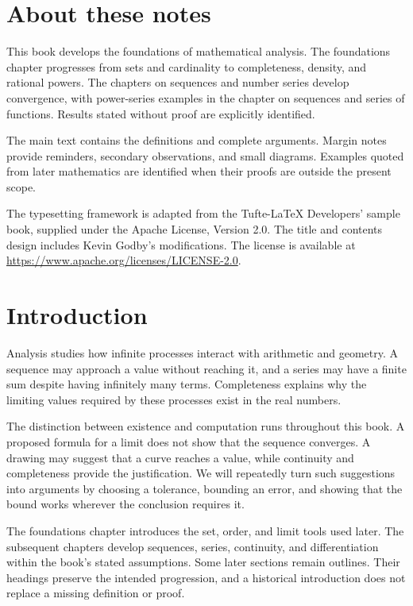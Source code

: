 \chapter*{About these notes}

This book develops the foundations of mathematical analysis.
The foundations chapter progresses from sets and cardinality to
completeness, density, and rational powers.
The chapters on sequences and number series develop convergence,
with power-series examples in the chapter on sequences and series
of functions. Results stated without proof are explicitly identified.

The main text contains the definitions and complete arguments. Margin
notes provide reminders, secondary observations, and small diagrams.
Examples quoted from later mathematics are identified when their proofs
are outside the present scope.


 The typesetting framework is adapted from
the Tufte-\LaTeX{} Developers' sample book, supplied under the Apache License,
Version 2.0. The title and contents design includes Kevin Godby's modifications.
The license is available at \url{https://www.apache.org/licenses/LICENSE-2.0}.

\chapter*{Introduction}
\label{ch:introduction-to-analysis}


Analysis studies how infinite processes interact with arithmetic and
geometry. A sequence may approach a value without reaching it, and a
series may have a finite sum despite having infinitely many terms.
Completeness explains why the limiting values required by these
processes exist in the real numbers.

The distinction between existence and computation runs throughout this
book. A proposed formula for a limit does not show that the sequence
converges. A drawing may suggest that a curve reaches a value, while
continuity and completeness provide the justification. We will repeatedly
turn such suggestions into arguments by choosing a tolerance, bounding
an error, and showing that the bound works wherever the conclusion
requires it.

The foundations chapter introduces the set, order, and limit tools used
later. The subsequent chapters develop sequences, series, continuity,
and differentiation within the book's stated assumptions. Some later
sections remain outlines. Their headings preserve the intended
progression, and a historical introduction does not replace a missing
definition or proof.
